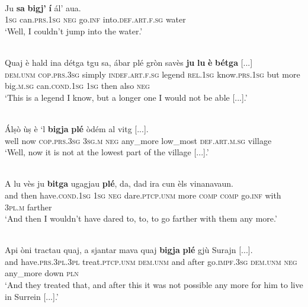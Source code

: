 \ea\label{}
\\
\gll  Ju \textbf{sa} \textbf{bigj’} \textbf{í} ál’ aua.\\
\textsc{1sg} can.\textsc{prs.1sg} \textsc{neg} go.\textsc{inf} into.\textsc{def.art.f.sg} water \\
\glt `Well, I couldn’t jump into the water.'
\z


\ea\label{}
\\
\gll    Quaj è hald ina détga tgu sa, ábar plé gròn savès \textbf{ju} \textbf{lu} \textbf{è} \textbf{bétga} [...]\\
\textsc{dem.unm} \textsc{cop.prs.3sg} simply \textsc{indef.art.f.sg} legend \textsc{rel.1sg} know.\textsc{prs.1sg} but more big.\textsc{m.sg} can.\textsc{cond.1sg} \textsc{1sg} then also \textsc{neg}\\
\glt `This is a legend I know, but a longer one I would not be able [...].'
\z

\ea\label{}
\\
\gll  Álṣò ùṣ è `l \textbf{bigja} \textbf{plé} òdém al vitg [...]. \\
well now  \textsc{cop.prs.3sg} \textsc{3sg.m} \textsc{neg} any\_more low\_most \textsc{def.art.m.sg} village\\
\glt `Well, now it is not at the lowest part of the village [...].'
\z

\ea\label{}
\\
\gll  A lu vès ju \textbf{bitga} ugagjau \textbf{plé}, da, dad ira cun èls vinanavaun.\\
and then have.\textsc{cond.1sg} \textsc{1sg} \textsc{neg} dare.\textsc{ptcp.unm} more \textsc{comp} \textsc{comp} go.\textsc{inf} with \textsc{3pl.m} farther\\
\glt `And then I wouldn’t have dared to, to, to go farther with them any more.'
\z

\ea\label{}
\\
\gll Api òni tractau quaj, a sjantar mava quaj \textbf{bigja} \textbf{plé} gjù Surajn [...].\\
and have.\textsc{prs.3pl.3pl} treat.\textsc{ptcp.unm} \textsc{dem.unm} and after go.\textsc{impf.3sg} \textsc{dem.unm} \textsc{neg} any\_more down \textsc{pln}\\
\glt `And they treated that, and after this it was not possible any more for him to live in Surrein [...].'
\z


